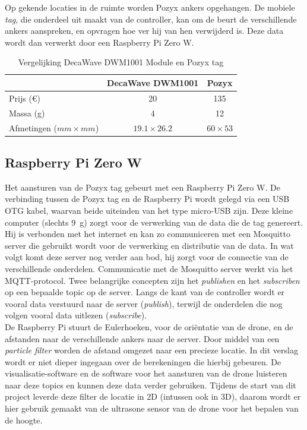 Op gekende locaties in de ruimte worden Pozyx ankers opgehangen.
De mobiele \textit{tag}, die onderdeel uit maakt van de controller, kan om de beurt de verschillende ankers aanspreken, en opvragen hoe ver hij van hen verwijderd is.
Deze data wordt dan verwerkt door een Raspberry Pi Zero W.\\

\begin{table}[p]
	\centering
	\begin{tabular}{ | l | c | c | } \hline
		& DecaWave DWM1001 & Pozyx \\
		\hline 
		\hline
		Prijs (\euro{}) & 20 & 135 \\ 
		\hline
		Massa (g) & 4 & 12 \\ 
		\hline
		Afmetingen ($mm \times mm$) & $19.1 \times 26.2$ & $60 \times 53$ \\ 
		\hline
	\end{tabular}
	\caption[Vergelijking DecaWave DWM1001 Module en Pozyx tag]{Vergelijking DecaWave DWM1001 Module en Pozyx tag}
	\label{tab:decavspozyx}
\end{table}

\subsection{Raspberry Pi Zero W} \label{sec:zerow}
Het aansturen van de Pozyx tag gebeurt met een Raspberry Pi Zero W.
De verbinding tussen de Pozyx tag en de Raspberry Pi wordt gelegd via een USB OTG kabel, waarvan beide uiteinden van het type micro-USB zijn.
Deze kleine computer (slechts \SI{9}{\g}) zorgt voor de verwerking van de data die de tag genereert.
Hij is verbonden met het internet en kan zo communiceren met een Mosquitto server die gebruikt wordt voor de verwerking en distributie van de data.
In wat volgt komt deze server nog verder aan bod, hij zorgt voor de connectie van de verschillende onderdelen.
Communicatie met de Mosquitto server werkt via het MQTT-protocol.
Twee belangrijke concepten zijn het \textit{publishen} en het \textit{subscriben} op een bepaalde topic op de server.
Langs de kant van de controller wordt er vooral data verstuurd naar de server (\textit{publish}), terwijl de onderdelen die nog volgen vooral data uitlezen (\textit{subscribe}).\\

De Raspberry Pi stuurt de Eulerhoeken, voor de oriëntatie van de drone, en de afstanden naar de verschillende ankers naar de server. Door middel van een \textit{particle filter} worden de afstand omgezet naar een precieze locatie.
In dit verslag wordt er niet dieper ingegaan over de berekeningen die hierbij gebeuren.
De visualisatie-software en de software voor het aansturen van de drone luisteren naar deze topics en kunnen deze data verder gebruiken.
Tijdens de start van dit project leverde deze filter de locatie in 2D (intussen ook in 3D), daarom wordt er hier gebruik gemaakt van de ultrasone sensor van de drone voor het bepalen van de hoogte.\\

